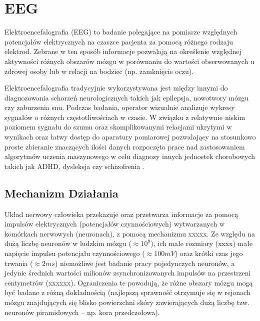 \documentclass{./assets/wfis}
\begin{document}
\section{EEG}
Elektroencefalografia (EEG) to badanie polegające na pomiarze względnych potencjałów elektrycznych na czaszce pacjenta za pomocą różnego rodzaju elektrod. Zebrane w ten sposób informacje pozwalają na określenie względnej aktywności różnych obszarów mózgu w porównaniu do wartości obserwowanych u zdrowej osoby lub w relacji na bodziec (np. zamknięcie oczu).

Elektroencefalografia tradycyjnie wykorzystywana jest między innymi do diagnozowania schorzeń neurologicznych takich jak epilepsja, nowotwory mózgu czy zaburzenia snu. Podczas badania, operator wizualnie analizuje wykresy sygnałów o różnych częstotliwościach w czasie. W związku z relatywnie niskim poziomem sygnału do szumu oraz skomplikowanymi relacjami ukrytymi w wynikach oraz łatwy dostęp do aparatury pomiarowej pozwalający na stosunkowo proste zbieranie znaczących ilości danych rozpoczęto prace nad zastosowaniem algorytmów uczenia maszynowego w celu diagnozy innych jednostek chorobowych takich jak ADHD, dysleksja czy schizofrenia \cite{ahire_comprehensive_2022, joshi_review_2021, clarke_eeg_2002}.

\subsection{Mechanizm Działania}

Układ nerwowy człowieka przekazuje oraz przetwarza informacje za pomocą impulsów elektrycznych (potencjałów czynnościowych) wytwarzanych w komórkach nerwowych (neuronach), z pomocą mechanizmu xxxxx. Ze względu na dużą liczbę neuronów w ludzkim mózgu ($\approx10^9$\cite{herculano-houzel_human_2009}), ich małe rozmiary (xxxx) małe napięcie impulsu potencjału czynnościowego ($\approx100mV$\cite{biga_125_2019}) oraz krótki czas jego trwania ($\approx2ms$\cite{biga_125_2019}) niemożliwe jest badanie pracy pojedynczych neuronów, a jedynie średnich wartości milionów zsynchronizowanych impulsów na przestrzeni centymetrów (xxxxxx). Ograniczenia te powodują, że różne obszary mózgu mogą być badane z różną dokładnością (najlepszą sprawność otrzymuje się w rejonach mózgu znajdujących się blisko powierzchni skóry zawierających dużą liczbę tzw. neuronów piramidowych – np. kora przedczołowa).
\end{document}
